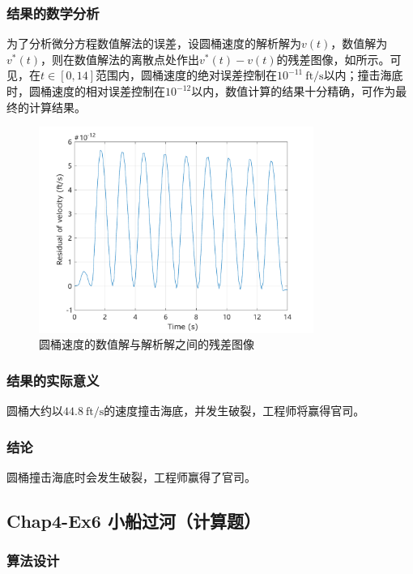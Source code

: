 \documentclass[12pt,a4paper]{article}
\begin{document}
\subsubsection{结果的数学分析}

为了分析微分方程数值解法的误差，设圆桶速度的解析解为$v(t)$，数值解为$v^*(t)$，则在数值解法的离散点处作出$v^*(t) - v(t)$的残差图像，如所示。可见，在$t\in[0,14]$范围内，圆桶速度的绝对误差控制在$10^{-11}\ \mathrm{ft/s}$以内；撞击海底时，圆桶速度的相对误差控制在$10^{-12}$以内，数值计算的结果十分精确，可作为最终的计算结果。

\begin{figure}[t]
    \centering
    \includegraphics[width=0.8\textwidth]{fig/ex5_residual.pdf}
    \caption{圆桶速度的数值解与解析解之间的残差图像}
    \label{fig:ex5_residual}
\end{figure}

\subsubsection{结果的实际意义}

圆桶大约以$44.8\ \mathrm{ft/s}$的速度撞击海底，并发生破裂，工程师将赢得官司。

\subsubsection{结论}

圆桶撞击海底时会发生破裂，工程师赢得了官司。

\subsection{Chap4-Ex6 小船过河（计算题）}

\subsubsection{算法设计}
\end{document}
